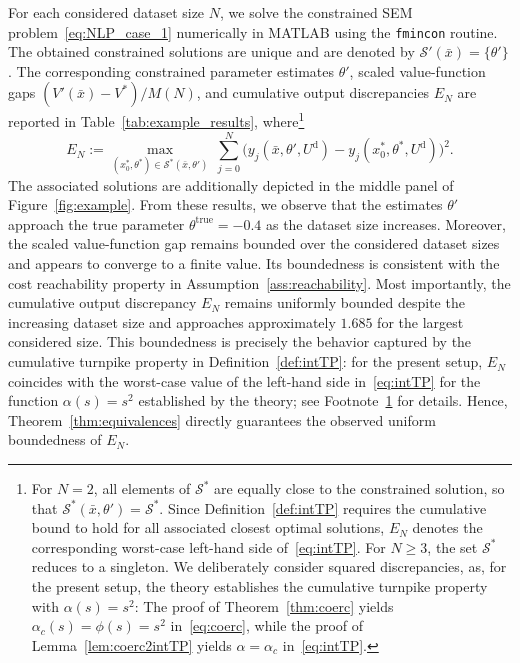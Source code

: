 \documentclass[a4paper,fleqn]{cas-dc}
\begin{document}
For each considered dataset size $N$, we solve the constrained SEM problem~\eqref{eq:NLP_case_1} numerically in MATLAB using the \texttt{fmincon} routine. The obtained constrained solutions are unique and are denoted by $\mathcal{S}'(\bar{x})=\{\theta'\}$.
The corresponding constrained parameter estimates $\theta'$, scaled value-function gaps $({V'(\bar{x})-V^*})/{M(N)}$, and cumulative output discrepancies $E_N$ are reported in Table~\ref{tab:example_results}, where\footnote{\label{footnote:EN}
	For $N=2$, all elements of $\mathcal S^*$ are equally close to the constrained solution, so that $\mathcal S^*(\bar x,\theta')=\mathcal S^*$. Since Definition~\ref{def:intTP} requires the cumulative bound to hold for all associated closest optimal solutions, $E_N$ denotes the corresponding worst-case left-hand side of~\eqref{eq:intTP}. For $N\geq3$, the set $\mathcal S^*$ reduces to a singleton.
	We deliberately consider squared discrepancies, as, for the present setup, the theory establishes the cumulative turnpike property with \(\alpha(s)=s^2\): The proof of Theorem~\ref{thm:coerc} yields $\alpha_c(s)=\phi(s)=s^2$ in~\eqref{eq:coerc}, while the proof of Lemma~\ref{lem:coerc2intTP} yields $\alpha=\alpha_c$ in~\eqref{eq:intTP}.
}
\begin{equation*}
	E_N{:=}\max_{(x_0^*,\theta^*)\in\mathcal{S}^*(\bar{x},\theta')} \ \sum_{j=0}^N \big(y_j(\bar{x},\theta',U^{\mathrm d}) - y_j(x_0^*, \theta^*, U^{\mathrm d})\big)^2.
\end{equation*}
The associated solutions are additionally depicted in the middle panel of Figure~\ref{fig:example}.
From these results, we observe that the estimates $\theta'$ approach the true parameter $\theta^{\mathrm{true}}=-0.4$ as the dataset size increases.
Moreover, the scaled value-function gap remains bounded over the considered dataset sizes and appears to converge to a finite value. Its boundedness is consistent with the cost reachability property in Assumption~\ref{ass:reachability}.
Most importantly, the cumulative output discrepancy $E_N$ remains uniformly bounded despite the increasing dataset size and approaches approximately $1.685$ for the largest considered size.
This boundedness is precisely the behavior captured by the cumulative turnpike property in Definition~\ref{def:intTP}: for the present setup, $E_N$ coincides with the worst-case value of the left-hand side in~\eqref{eq:intTP} for the function $\alpha(s)=s^2$ established by the theory; see Footnote~\ref{footnote:EN} for details. Hence, Theorem~\ref{thm:equivalences} directly guarantees the observed uniform boundedness of $E_N$.
\end{document}
